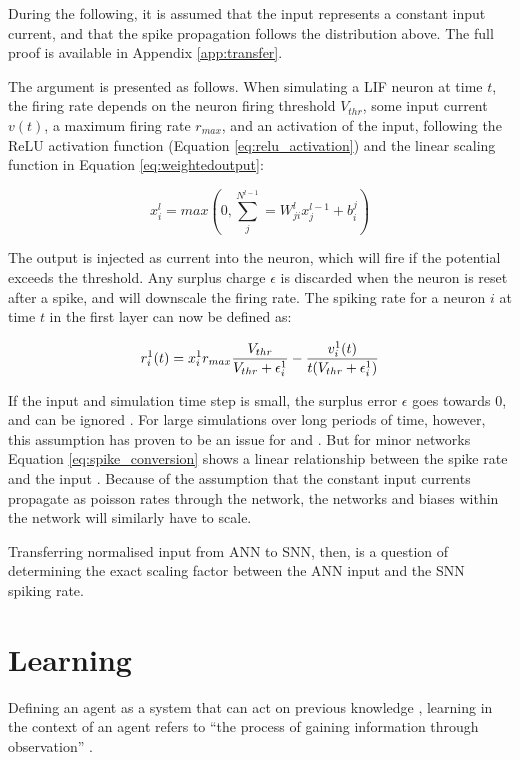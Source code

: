 \documentclass[report.tex]{subfiles}
\begin{document}
During the following, it is assumed that the input represents a constant
input current, and that the spike propagation follows the distribution
above.
The full proof is available in Appendix \ref{app:transfer}.

The argument is presented as follows.
When simulating a LIF
neuron at time $t$, the firing rate depends on the neuron firing threshold $V_{thr}$,
some input current $v(t)$, a maximum
firing rate $r_{max}$, and an activation of the input, following the
ReLU activation function (Equation \ref{eq:relu_activation}) and 
the linear scaling function in Equation \ref{eq:weightedoutput}:

\begin{equation}
x_i^l = max\left(0, \sum^{N^{l - 1}}_j= W^l_{ji} x_j^{l - 1} + b_i^j\right)
  \label{eq:relu_activation}
\end{equation}

The output is injected as current into the neuron, which will fire if the
potential exceeds the threshold.
Any surplus charge $\epsilon$ is discarded when the neuron is reset
after a spike, and will downscale the firing rate.
The spiking rate for a neuron $i$ at time $t$ in the first layer can
now be defined as:

\begin{equation}
r_i^1(t) = x_i^1 r_{max} {V_{thr} \over V_{thr} + \epsilon_i^1 } - {v_i^1(t) \over t (V_{thr} + \epsilon_i^1) }
\label{eq:spike_conversion}
\end{equation}

If the input and simulation time step is small, the surplus
error $\epsilon$ goes towards 0, and can be ignored \cite{Rueckauer2017}.
For large simulations over long periods of time, however, this assumption has proven to be an issue for \citeauthor{Diehl2015} and
\citeauthor{Rueckauer2017}.
But for minor networks Equation \ref{eq:spike_conversion} shows a 
linear relationship between the spike rate and the input
\cite{Rueckauer2017}.
Because of the assumption that the constant input currents propagate as poisson rates
through the network, the networks and biases within the network will similarly
have to scale.

Transferring normalised input from \gls{ANN} to \gls{SNN}, then, is
a question of determining the exact scaling factor between the \gls{ANN} input
and the \gls{SNN} spiking rate.

\section{Learning}  \label{sec:learning}
Defining an \gls{agent} as a system that can act on previous knowledge
\cite{Russel2007}, learning in the context of an \gls{agent}
refers to ``the process of gaining
information through observation'' \cite{sep:learning-formal}.
\end{document}
